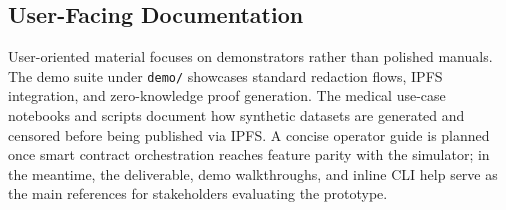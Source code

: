 \subsection{User-Facing Documentation}
User-oriented material focuses on demonstrators rather than polished manuals. The demo suite under \texttt{demo/} showcases standard redaction flows, IPFS integration, and zero-knowledge proof generation. The medical use-case notebooks and scripts document how synthetic datasets are generated and censored before being published via IPFS. A concise operator guide is planned once smart contract orchestration reaches feature parity with the simulator; in the meantime, the deliverable, demo walkthroughs, and inline CLI help serve as the main references for stakeholders evaluating the prototype.
